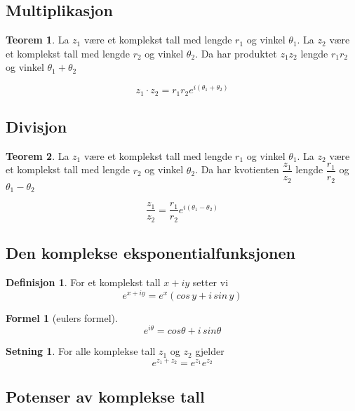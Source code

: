 \documentclass[11pt]{article}
\theoremstyle{definition}
\newtheorem{mindef}{Definisjon}[section]
\newenvironment{fmindef}
{\begin{mdframed}[style=minstil]\begin{mindef}}
		{\end{mindef}\end{mdframed}}
\theoremstyle{definition}
\theoremstyle{definition}
\newtheorem{minset}{Setning}[section]
\newenvironment{fminset}
{\begin{mdframed}[style=minstil]\begin{minset}}
		{\end{minset}\end{mdframed}}
\theoremstyle{definition}
\newtheorem{teo}{Teorem}[section]
\newenvironment{fteo}
{\begin{mdframed}[style=minstil]\begin{teo}}
		{\end{teo}\end{mdframed}}
\theoremstyle{definition}
\theoremstyle{definition}
\newtheorem{formel}{Formel}
\begin{document}
	\subsection{Multiplikasjon}
	
	\begin{fteo}
		La \(z_1\) være et komplekst tall med lengde \(r_1\) og vinkel \(\theta_1 \). La \(z_2\) være et komplekst tall med lengde \(r_2\) og vinkel \(\theta_2 \). Da har produktet \(z_1z_2\) lengde \(r_1r_2\) og vinkel \(\theta_1 + \theta_2 \)
		
		\[z_1\cdot z_2=r_1 r_2e^{i(\theta_1 + \theta_2)} \]
	\end{fteo}
	
	\subsection{Divisjon}
	
	\begin{fteo}
				La \(z_1\) være et komplekst tall med lengde \(r_1\) og vinkel \(\theta_1 \). La \(z_2\) være et komplekst tall med lengde \(r_2\) og vinkel \(\theta_2 \). Da har kvotienten \(\dfrac{z_1}{z_2}\) lengde \(\dfrac{r_1}{r_2}\) og \(\theta_1 - \theta_2 \)
				
				\[\dfrac{z_1}{z_2}=\dfrac{r_1}{r_2}e^{i(\theta_1 -\theta_2)}\]
	\end{fteo}
	
	\newpage
	
	\subsection{Den komplekse eksponentialfunksjonen}

	\begin{fmindef}
			For et komplekst tall \(x+iy\) setter vi \[e^{x+iy}=e^x(cos\, y + i\, sin\, y) \]
	\end{fmindef}
	
	\begin{formel}[eulers formel]
\begin{equation}
	e^{i\theta}=cos\theta + i\, sin\theta 
\end{equation}
	\end{formel}
	
	\begin{fminset}
		For alle komplekse tall \(z_1\) og \(z_2\) gjelder \[e^{z_1+z_2}=e^{z_1}e^{z_2}\]
	\end{fminset}
	
	\subsection{Potenser av komplekse tall}
	
\end{document}
